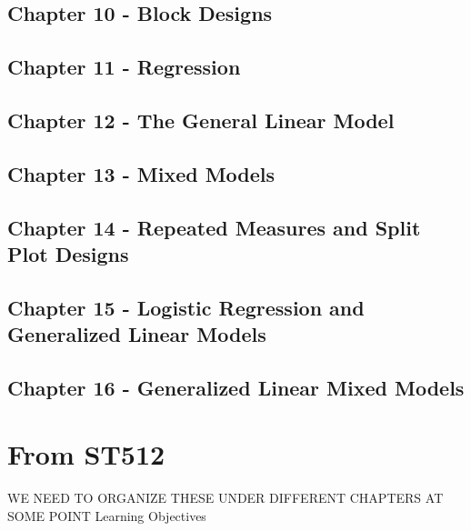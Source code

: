 \documentclass[]{book}
\begin{document}
\subsection{Chapter 10 - Block
Designs}\label{chapter-10---block-designs}

\subsection{Chapter 11 - Regression}\label{chapter-11---regression}

\subsection{Chapter 12 - The General Linear
Model}\label{chapter-12---the-general-linear-model}

\subsection{Chapter 13 - Mixed Models}\label{chapter-13---mixed-models}

\subsection{Chapter 14 - Repeated Measures and Split Plot
Designs}\label{chapter-14---repeated-measures-and-split-plot-designs}

\subsection{Chapter 15 - Logistic Regression and Generalized Linear
Models}\label{chapter-15---logistic-regression-and-generalized-linear-models}

\subsection{Chapter 16 - Generalized Linear Mixed
Models}\label{chapter-16---generalized-linear-mixed-models}

\section{From ST512}\label{from-st512}

WE NEED TO ORGANIZE THESE UNDER DIFFERENT CHAPTERS AT SOME POINT
Learning Objectives
\end{document}
